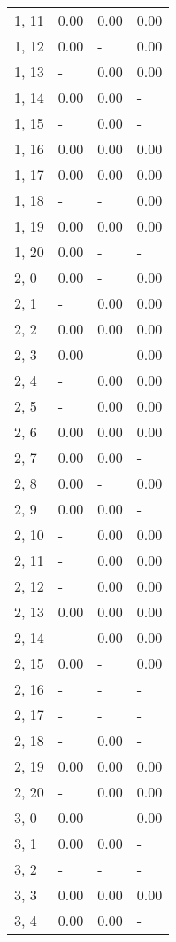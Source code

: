 \begin{table}
\begin{tabular}{llll}
1, 11  &  0.00 &  0.00 &  0.00 \\
1, 12  &  0.00 &     - &  0.00 \\
1, 13  &     - &  0.00 &  0.00 \\
1, 14  &  0.00 &  0.00 &     - \\
1, 15  &     - &  0.00 &     - \\
1, 16  &  0.00 &  0.00 &  0.00 \\
1, 17  &  0.00 &  0.00 &  0.00 \\
1, 18  &     - &     - &  0.00 \\
1, 19  &  0.00 &  0.00 &  0.00 \\
1, 20  &  0.00 &     - &     - \\
2, 0   &  0.00 &     - &  0.00 \\
2, 1   &     - &  0.00 &  0.00 \\
2, 2   &  0.00 &  0.00 &  0.00 \\
2, 3   &  0.00 &     - &  0.00 \\
2, 4   &     - &  0.00 &  0.00 \\
2, 5   &     - &  0.00 &  0.00 \\
2, 6   &  0.00 &  0.00 &  0.00 \\
2, 7   &  0.00 &  0.00 &     - \\
2, 8   &  0.00 &     - &  0.00 \\
2, 9   &  0.00 &  0.00 &     - \\
2, 10  &     - &  0.00 &  0.00 \\
2, 11  &     - &  0.00 &  0.00 \\
2, 12  &     - &  0.00 &  0.00 \\
2, 13  &  0.00 &  0.00 &  0.00 \\
2, 14  &     - &  0.00 &  0.00 \\
2, 15  &  0.00 &     - &  0.00 \\
2, 16  &     - &     - &     - \\
2, 17  &     - &     - &     - \\
2, 18  &     - &  0.00 &     - \\
2, 19  &  0.00 &  0.00 &  0.00 \\
2, 20  &     - &  0.00 &  0.00 \\
3, 0   &  0.00 &     - &  0.00 \\
3, 1   &  0.00 &  0.00 &     - \\
3, 2   &     - &     - &     - \\
3, 3   &  0.00 &  0.00 &  0.00 \\
3, 4   &  0.00 &  0.00 &     - \\

\end{tabular}
\end{table}
